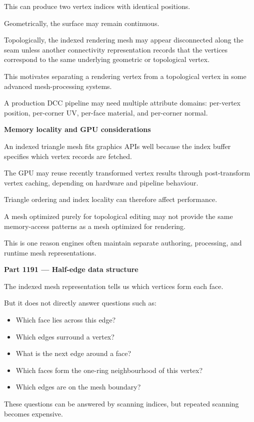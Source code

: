 This can produce two vertex indices with identical positions.

Geometrically, the surface may remain continuous.

Topologically, the indexed rendering mesh may appear disconnected along the seam unless another connectivity representation records that the vertices correspond to the same underlying geometric or topological vertex.

This motivates separating a rendering vertex from a topological vertex in some advanced mesh-processing systems.

A production DCC pipeline may need multiple attribute domains: per-vertex position, per-corner UV, per-face material, and per-corner normal.

\textbf{Memory locality and GPU considerations}

An indexed triangle mesh fits graphics APIs well because the index buffer specifies which vertex records are fetched.

The GPU may reuse recently transformed vertex results through post-transform vertex caching, depending on hardware and pipeline behaviour.

Triangle ordering and index locality can therefore affect performance.

A mesh optimized purely for topological editing may not provide the same memory-access patterns as a mesh optimized for rendering.

This is one reason engines often maintain separate authoring, processing, and runtime mesh representations.

\textbf{Part 1191 --- Half-edge data structure}

The indexed mesh representation tells us which vertices form each face.

But it does not directly answer questions such as:

\begin{itemize}
\tightlist
\item
  Which face lies across this edge?
\item
  Which edges surround a vertex?
\item
  What is the next edge around a face?
\item
  Which faces form the one-ring neighbourhood of this vertex?
\item
  Which edges are on the mesh boundary?
\end{itemize}

These questions can be answered by scanning indices, but repeated scanning becomes expensive.

